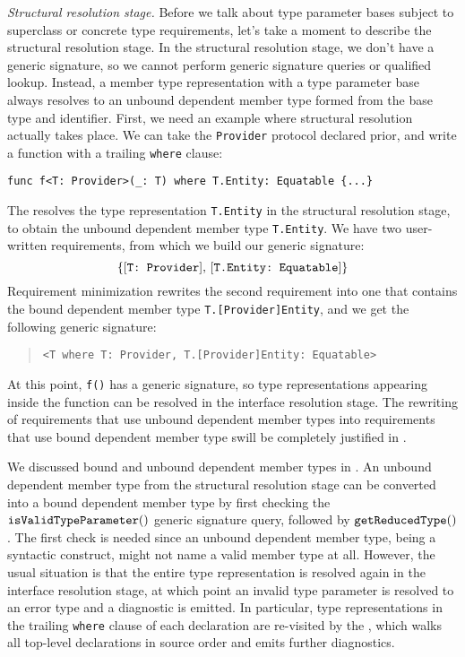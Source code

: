 \documentclass[../generics]{subfiles}
\begin{document}
\emph{Structural resolution stage.} Before we talk about type parameter bases subject to superclass or concrete type requirements, let's take a moment to describe the structural resolution stage. In the structural resolution stage, we don't have a generic signature, so we cannot perform generic signature queries or qualified lookup. Instead, a member type representation with a type parameter base always resolves to an unbound dependent member type formed from the base type and identifier. First, we need an example where structural resolution actually takes place. We can take the \texttt{Provider} protocol declared prior, and write a function with a trailing \texttt{where} clause:
\begin{Verbatim}
func f<T: Provider>(_: T) where T.Entity: Equatable {...}
\end{Verbatim}
The  resolves the type representation \texttt{T.Entity} in the structural resolution stage, to obtain the unbound dependent member type \texttt{T.Entity}. We have two user-written requirements, from which we build our generic signature:
\[\{[\texttt{T:~Provider}],\,[\texttt{T.Entity:~Equatable}]\}\]
Requirement minimization rewrites the second requirement into one that contains the bound dependent member type \texttt{T.[Provider]Entity}, and we get the following generic signature:
\begin{quote}
\begin{verbatim}
<T where T: Provider, T.[Provider]Entity: Equatable>
\end{verbatim}
\end{quote}
At this point, \texttt{f()} has a generic signature, so type representations appearing inside the function can be resolved in the interface resolution stage. The rewriting of requirements that use unbound dependent member types into requirements that use bound dependent member type swill be completely justified in .

We discussed bound and unbound dependent member types in . An unbound dependent member type from the structural resolution stage can be converted into a bound dependent member type by first checking the 
$\texttt{isValidTypeParameter}()$ generic signature query, followed by $\texttt{getReducedType}()$. The first check is needed since an unbound dependent member type, being a syntactic construct, might not name a valid member type at all. However, the usual situation is that the entire type representation is resolved again in the interface resolution stage, at which point an invalid type parameter is resolved to an error type and a diagnostic is emitted. In particular, type representations in the trailing \texttt{where} clause of each declaration are re-visited by the , which walks all top-level declarations in source order and emits further diagnostics.
\end{document}
